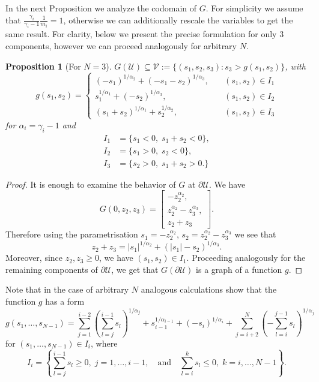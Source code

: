 \documentclass[11pt]{article}
\newtheorem{prop}[tw]{Proposition}
\numberwithin{equation}{section}
\numberwithin{tw}{section}
\begin{document}
 In the next Proposition we analyze the codomain of $G$. For simplicity we assume that $\frac{\gamma_i}{\gamma_i-1}\frac{1}{m_i}=1$, otherwise we can additionally rescale the variables to get the same result. For clarity, below we present the precise formulation for only $3$ components, however we can proceed analogously for arbitrary $N$.

\begin{prop}[For $N=3$]
    $G(\mathcal{U})\subseteq \mathcal{V}:=\{(s_1,s_2,s_3): s_3>g(s_1,s_2)\}$, with 
    \[ g(s_1,s_2) = \left\{\begin{aligned}
        (-s_1)^{1/\alpha_2}+(-s_1-s_2)^{1/\alpha_3}, &\quad (s_1,s_2)\in I_1 \\
        s_1^{1/\alpha_1}+(-s_2)^{1/\alpha_3}, &\quad (s_1,s_2)\in I_2 \\
        (s_1+s_2)^{1/\alpha_1}+s_2^{1/\alpha_2}, &\quad (s_1,s_2)\in I_3
    \end{aligned}\right. \]
    for $\alpha_i=\gamma_i-1$ and
    \[ \begin{aligned}
        I_1 &= \{s_1<0, \; s_1+s_2<0 \}, \\
        I_2 &= \{s_1>0, \; s_2<0 \}, \\
        I_3 &= \{s_2>0, \; s_1+s_2>0. \}
    \end{aligned}\]
\end{prop}
\begin{proof}
    It is enough to examine the behavior of $G$ at $\partial\mathcal{U}$. We have
    \[ G(0,z_2,z_3) = \begin{bmatrix}
        -z_2^{\alpha_2}, \\
        z_2^{\alpha_2}-z_3^{\alpha_3}, \\
        z_2+z_3
    \end{bmatrix}.\]
    Therefore using the parametrisation $s_1=-z_2^{\alpha_2}$, $s_2=z_2^{\alpha_2}-z_3^{\alpha_3}$ we see that 
    \[ z_2+z_3 = |s_1|^{1/\alpha_2}+(|s_1|-s_2)^{1/\alpha_3}. \]
    Moreover, since $z_2,z_3\geq 0$, we have $(s_1,s_2)\in I_1$. Proceeding analogously for the remaining components of $\partial\mathcal{U}$, we get that $G(\partial\mathcal{U})$ is a graph of a function $g$.
\end{proof}
Note that in the case of arbitrary $N$ analogous calculations show that the function $g$ has a form 
\[ g(s_1,\dots,s_{N-1}) = \sum_{j=1}^{i-2}\left(\sum_{l=j}^{i-1}s_l\right)^{1/\alpha_j} + s_{i-1}^{1/\alpha_{i-1}}+(-s_i)^{1/\alpha_i} + \sum_{j=i+2}^N\left(-\sum_{l=i}^{j-1}s_l\right)^{1/\alpha_j} \]
for $(s_1,\dots,s_{N-1})\in I_i$, where
\[ I_i = \left\{\sum_{l=j}^{i-1}s_l \geq 0, \; j=1,\dots,i-1, \quad \text{and} \quad \sum_{l=i}^k s_l \leq 0, \; k=i,\dots,N-1\right\}. \]
\end{document}
